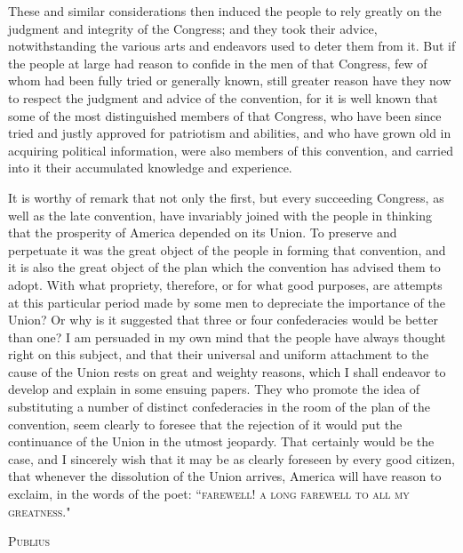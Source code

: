 These and similar considerations then induced the people to rely greatly on the judgment and integrity of the Congress; and they took their advice, notwithstanding the various arts and endeavors used to deter them from it. But if the people at large had reason to confide in the men of that Congress, few of whom had been fully tried or generally known, still greater reason have they now to respect the judgment and advice of the convention, for it is well known that some of the most distinguished members of that Congress, who have been since tried and justly approved for patriotism and abilities, and who have grown old in acquiring political information, were also members of this convention, and carried into it their accumulated knowledge and experience.

It is worthy of remark that not only the first, but every succeeding Congress, as well as the late convention, have invariably joined with the people in thinking that the prosperity of America depended on its Union. To preserve and perpetuate it was the great object of the people in forming that convention, and it is also the great object of the plan which the convention has advised them to adopt. With what propriety, therefore, or for what good purposes, are attempts at this particular period made by some men to depreciate the importance of the Union? Or why is it suggested that three or four confederacies would be better than one? I am persuaded in my own mind that the people have always thought right on this subject, and that their universal and uniform attachment to the cause of the Union rests on great and weighty reasons, which I shall endeavor to develop and explain in some ensuing papers. They who promote the idea of substituting a number of distinct confederacies in the room of the plan of the convention, seem clearly to foresee that the rejection of it would put the continuance of the Union in the utmost jeopardy. That certainly would be the case, and I sincerely wish that it may be as clearly foreseen by every good citizen, that whenever the dissolution of the Union arrives, America will have reason to exclaim, in the words of the poet: ``\textsc{farewell}! \textsc{a long farewell to all my greatness}."

\vspace{.5cm}
\textsc{Publius}
